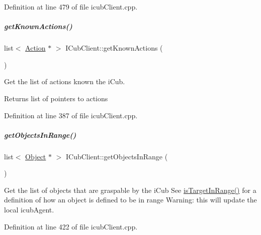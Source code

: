 Definition at line 479 of file icub\+Client.\+cpp.

\mbox{\label{group__icubclient__clients_ad50cd8953af1f4c418e79c2319a6ce44}} 
\subparagraph{\texorpdfstring{get\+Known\+Actions()}{getKnownActions()}}
{\footnotesize\ttfamily list$<$ \hyperlink{group__icubclient__representations_classicubclient_1_1Action}{Action} $\ast$ $>$ I\+Cub\+Client\+::get\+Known\+Actions (\begin{DoxyParamCaption}{ }\end{DoxyParamCaption})}



Get the list of actions known the i\+Cub. 

\begin{DoxyReturn}{Returns}
list of pointers to actions 
\end{DoxyReturn}


Definition at line 387 of file icub\+Client.\+cpp.

\mbox{\label{group__icubclient__clients_ab6f337af95d90108deb4c12530bccec0}} 
\subparagraph{\texorpdfstring{get\+Objects\+In\+Range()}{getObjectsInRange()}}
{\footnotesize\ttfamily list$<$ \hyperlink{group__icubclient__representations_classicubclient_1_1Object}{Object} $\ast$ $>$ I\+Cub\+Client\+::get\+Objects\+In\+Range (\begin{DoxyParamCaption}{ }\end{DoxyParamCaption})}



Get the list of objects that are graspable by the i\+Cub See \hyperlink{group__icubclient__clients_ae2c6388e184ee5f8feeb5c79901f32d5}{is\+Target\+In\+Range()} for a definition of how an object is defined to be in range Warning\+: this will update the local icub\+Agent. 



Definition at line 422 of file icub\+Client.\+cpp.

